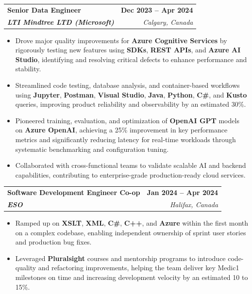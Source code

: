 \documentclass[letterpaper,11pt]{article}
\makeatletter
\newcommand{\resumeItem}[1]{
  \item\small{
    {#1 \vspace{-2pt}}
  }
}
\newcommand{\resumeSubheading}[4]{
  \vspace{-2pt}\item
    \begin{tabular*}{1.0\textwidth}[t]{l@{\extracolsep{\fill}}r}
      \textbf{#1} & \textbf{\small #2} \\
      \textit{\small#3} & \textit{\small #4} \\
    \end{tabular*}\vspace{-7pt}
}
\newcommand{\resumeItemListStart}{\begin{itemize}}
\newcommand{\resumeItemListEnd}{\end{itemize}\vspace{-5pt}}
\makeatother
\begin{document}
    \resumeSubheading
      {\textbf{Senior Data Engineer}}{\textbf{Dec 2023 -- Apr 2024}}
      {\textbf{LTI Mindtree LTD (Microsoft)}}{Calgary, Canada}
      \resumeItemListStart
        \resumeItem{Drove major quality improvements for \textbf{Azure Cognitive Services} by rigorously testing new features using \textbf{SDKs}, \textbf{REST APIs}, and \textbf{Azure AI Studio}, identifying and resolving critical defects to enhance performance and stability.}
        \resumeItem{Streamlined code testing, database analysis, and container-based workflows using \textbf{Jupyter}, \textbf{Postman}, \textbf{Visual Studio}, \textbf{Java}, \textbf{Python}, \textbf{C\#}, and \textbf{Kusto} queries, improving product reliability and observability by an estimated 30\%.}
        \resumeItem{Pioneered training, evaluation, and optimization of \textbf{OpenAI GPT} models on \textbf{Azure OpenAI}, achieving a 25\% improvement in key performance metrics and significantly reducing latency for real-time workloads through systematic benchmarking and configuration tuning.}
        \resumeItem{Collaborated with cross-functional teams to validate scalable AI and backend capabilities, contributing to enterprise-grade production-ready cloud services.}
      \resumeItemListEnd
    
    \resumeSubheading
      {\textbf{Software Development Engineer Co-op}}{\textbf{Jan 2024 -- Apr 2024}}
      {\textbf{ESO}}{Halifax, Canada}
      \resumeItemListStart
        \resumeItem{Ramped up on \textbf{XSLT}, \textbf{XML}, \textbf{C\#}, \textbf{C++}, and \textbf{Azure} within the first month on a complex codebase, enabling independent ownership of sprint user stories and production bug fixes.}
        \resumeItem{Leveraged \textbf{Pluralsight} courses and mentorship programs to introduce code-quality and refactoring improvements, helping the team deliver key Medic1 milestones on time and increasing development velocity by an estimated 10 to 15\%.}
      \resumeItemListEnd
\end{document}
